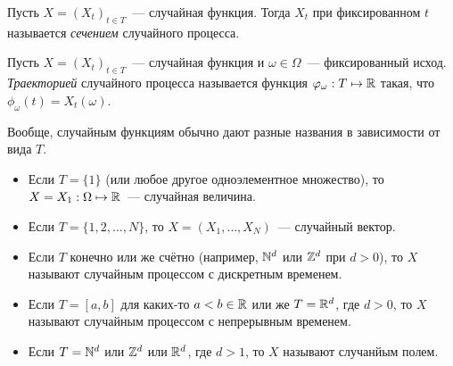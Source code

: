 \begin{definition}
	Пусть \(X = (X_{t})_{t \in T}\)~--- случайная функция. Тогда \(X_{t}\) при 
	фиксированном \(t\) называется \emph{сечением} случайного процесса.
\end{definition}

\begin{definition}
	Пусть \(X = (X_{t})_{t \in T}\)~--- случайная функция и \(\omega \in 
	\Omega\)~--- фиксированный исход. \emph{Траекторией} случайного процесса 
	называется функция \(\varphi_{\omega} : T \mapsto \mathbb{R}\) такая, что 
	\(\phi_{\omega}(t) = X_{t}(\omega)\). 
\end{definition}

Вообще, случайным функциям обычно дают разные названия в зависимости от вида 
\(T\).
\begin{itemize}
	\item Если \(T = \{1\}\) (или любое другое одноэлементное множество), то 
	\(X = X_{1} : \Omega \mapsto \mathbb{R}\)~--- случайная величина.
	\item Если \(T = \{1, 2, \ldots, N\}\), то \(X = (X_{1}, \ldots, 
	X_{N})\)~--- случайный вектор.
	\item Если \(T\) конечно или же счётно (например, \(\mathbb{N}^{d}\) или \(\mathbb{Z}^{d}\) 
	при \(d > 0\)), то \(X\) называют случайным процессом с дискретным временем.
	\item Если \(T = [a, b]\) для каких-то \(a  < b \in \mathbb{R}\) или же \(T = 
	\mathbb{R}^{d}\), где \(d > 0\), то \(X\) называют случайным процессом с 
	непрерывным временем.
	\item Если \(T = \mathbb{N}^{d}\) или \(\mathbb{Z}^{d}\) или \(\mathbb{R}^{d}\), где \(d > 1\), то 
	\(X\) называют случанйым полем.
\end{itemize}

